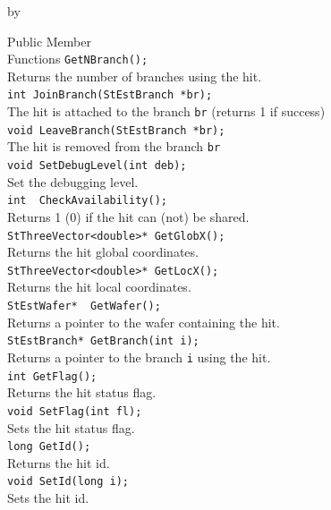 \documentclass[twoside]{article}
\newcommand{\entrylabel}[1]{\mbox{\textbf{{#1}}}\hfil}%
\newenvironment{entry}
{\begin{list}{}%
    {\renewcommand{\makelabel}{\entrylabel}%
     \setlength{\labelwidth}{90pt}%
     \setlength{\leftmargin}{\labelwidth}
     \advance\leftmargin by \labelsep%
      }%
    }%
  {\end{list}}
\newcommand{\Entrylabel}[1]%
{\raisebox{0pt}[1ex][0pt]{\makebox[\labelwidth][l]%
    {\parbox[t]{\labelwidth}{\hspace{0pt}\textbf{{#1}}}}}}
\newenvironment{Entry}%
{\renewcommand{\entrylabel}{\Entrylabel}\begin{entry}}%
  {\end{entry}}
\begin{document}
\begin{Entry}
\item[Public Member\\ Functions]
	\verb+GetNBranch();+\\
	Returns the number of branches using the hit.\\
	\verb+int JoinBranch(StEstBranch *br);+\\	
	The hit is attached to the branch \verb+br+ (returns 1 if success)\\
	\verb+void LeaveBranch(StEstBranch *br);+\\
	The hit is removed from the branch \verb+br+\\
	\verb+void SetDebugLevel(int deb);+\\
	Set the debugging level.\\
	\verb+int  CheckAvailability();+\\
	Returns 1 (0) if the hit can (not) be shared.\\
	\verb+StThreeVector<double>* GetGlobX();+\\ 
	Returns the hit global coordinates.\\
	\verb+StThreeVector<double>* GetLocX();+\\
	Returns the hit local coordinates.\\
	\verb+StEstWafer*  GetWafer();+\\
	Returns a pointer to the wafer containing the hit.\\
	\verb+StEstBranch* GetBranch(int i);+\\
	Returns a pointer to the branch \verb+i+ using the hit.\\
	\verb+int GetFlag();+\\
	Returns the hit status flag.\\
	\verb+void SetFlag(int fl);+\\	
	Sets the hit status flag.\\
	\verb+long GetId();+\\
	Returns the hit id.\\
	\verb+void SetId(long i);+\\	
	Sets the hit id.\\
\end{Entry}

%
%
\end{document}
